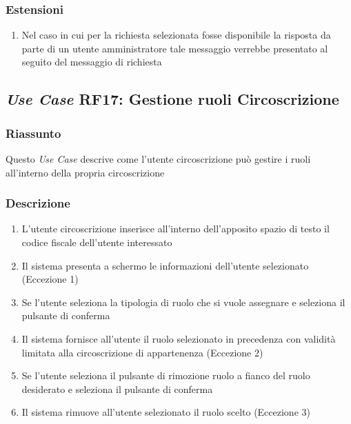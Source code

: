         \subsubsection{Estensioni}
            \begin{enumerate}
                \item Nel caso in cui per la richiesta selezionata fosse disponibile la risposta da parte di un utente amministratore tale messaggio verrebbe presentato al seguito del messaggio di richiesta 
            \end{enumerate}

    \subsection{\textit{Use Case} RF17: Gestione ruoli Circoscrizione}
        \subsubsection{Riassunto}
            Questo \textit{Use Case} descrive come l'utente circoscrizione può gestire i ruoli all'interno della propria circoscrizione
        \subsubsection{Descrizione}
            \begin{enumerate}
                \item L'utente circoscrizione inserisce all'interno dell'apposito spazio di testo il codice fiscale dell'utente interessato
                \item Il sistema presenta a schermo le informazioni dell'utente selezionato (Eccezione 1)
                \item Se l'utente seleziona la tipologia di ruolo che si vuole assegnare e seleziona il pulsante di conferma
                \item Il sistema fornisce all'utente il ruolo selezionato in precedenza con validità limitata alla circoscrizione di appartenenza (Eccezione 2)
                \item Se l'utente seleziona il pulsante di rimozione ruolo a fianco del ruolo desiderato e seleziona il pulsante di conferma
                \item Il sistema rimuove all'utente selezionato il ruolo scelto (Eccezione 3)
            \end{enumerate}
